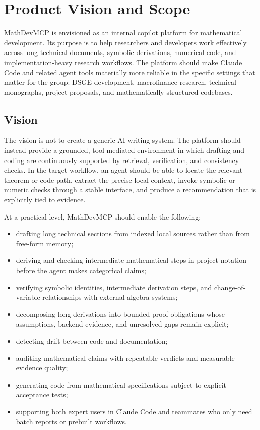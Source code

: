 \chapter{Product Vision and Scope}

MathDevMCP is envisioned as an internal copilot platform for mathematical development. Its purpose is to help researchers and developers work effectively across long technical documents, symbolic derivations, numerical code, and implementation-heavy research workflows. The platform should make Claude Code and related agent tools materially more reliable in the specific settings that matter for the group: DSGE development, macrofinance research, technical monographs, project proposals, and mathematically structured codebases.

\section{Vision}

The vision is not to create a generic AI writing system. The platform should instead provide a grounded, tool-mediated environment in which drafting and coding are continuously supported by retrieval, verification, and consistency checks. In the target workflow, an agent should be able to locate the relevant theorem or code path, extract the precise local context, invoke symbolic or numeric checks through a stable interface, and produce a recommendation that is explicitly tied to evidence.

At a practical level, MathDevMCP should enable the following:

\begin{itemize}
  \item drafting long technical sections from indexed local sources rather than from free-form memory;
  \item deriving and checking intermediate mathematical steps in project notation before the agent makes categorical claims;
  \item verifying symbolic identities, intermediate derivation steps, and change-of-variable relationships with external algebra systems;
  \item decomposing long derivations into bounded proof obligations whose assumptions, backend evidence, and unresolved gaps remain explicit;
  \item detecting drift between code and documentation;
  \item auditing mathematical claims with repeatable verdicts and measurable evidence quality;
  \item generating code from mathematical specifications subject to explicit acceptance tests;
  \item supporting both expert users in Claude Code and teammates who only need batch reports or prebuilt workflows.
\end{itemize}

